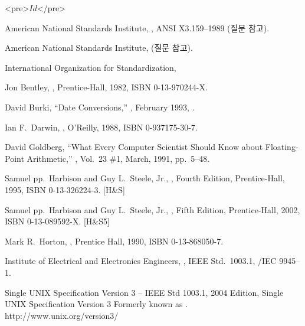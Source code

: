 \begin{thebibliography}{99}

\begin{rawhtml}
<pre>$Id$</pre>
\end{rawhtml}

 American National Standards Institute,
	, ANSI X3.159--1989 (질문  참고).

 American National Standards Institute, 
	 (질문  참고).

 International Organization for
        Standardization, 

 Jon Bentley, ,
	Prentice-Hall, 1982, ISBN 0-13-970244-X.

 David Burki, ``Date Conversions,''
	, February 1993, .

 Ian F.\  Darwin, ,
	O'Reilly, 1988, ISBN 0-937175-30-7.

 David Goldberg, 
	``What Every Computer Scientist Should Know about
	Floating-Point Arithmetic,'' , Vol.\  23 \#1,
	March, 1991, pp.\  5--48.

	Samuel pp.\  Harbison and Guy L.\  Steele, Jr., 
	,
	Fourth Edition, Prentice-Hall, 1995, ISBN 0-13-326224-3.   [H\&S]

	Samuel pp.\  Harbison and Guy L.\  Steele, Jr., 
	,
	Fifth Edition, Prentice-Hall, 2002, ISBN 0-13-089592-X.   [H\&S5]

	Mark R.\  Horton, , Prentice Hall, 1990,
	ISBN 0-13-868050-7.

	Institute of Electrical and Electronics Engineers,
	,
	IEEE Std.\  1003.1, \cite{c89}/IEC 9945--1.

	Single UNIX Specification Version 3 --
        IEEE Std 1003.1, 2004 Edition, Single UNIX Specification Version 3
        Formerly known as \cite{posix}. \\
        http://www.unix.org/version3/


\end{thebibliography}
